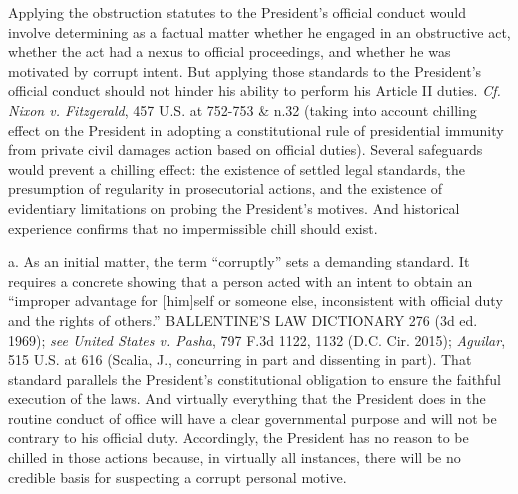 Applying the obstruction statutes to the President’s official conduct would involve determining as a factual matter whether he engaged in an obstructive act, whether the act had a nexus to official proceedings, and whether he was motivated by corrupt intent.
But applying those standards to the President’s official conduct should not hinder his ability to perform his Article II duties.
\textit{Cf. Nixon v. Fitzgerald}, 457 U.S. at 752-753 \& n.32 (taking into account chilling effect on the President in adopting a constitutional rule of presidential immunity from private civil damages action based on official duties).
Several safeguards would prevent a chilling effect: the existence of settled legal standards, the presumption of regularity in prosecutorial actions, and the existence of evidentiary limitations on probing the President’s motives.
And historical experience confirms that no impermissible chill should exist.

a. As an initial matter, the term “corruptly” sets a demanding standard.
It requires a concrete showing that a person acted with an intent to obtain an “improper advantage for [him]self or someone else, inconsistent with official duty and the rights of others.” BALLENTINE’S LAW DICTIONARY 276 (3d ed. 1969);
\textit{see United States v. Pasha}, 797 F.3d 1122, 1132 (D.C. Cir. 2015);
\textit{Aguilar}, 515 U.S. at 616 (Scalia, J., concurring in part and dissenting in part).
That standard parallels the President’s constitutional obligation to ensure the faithful execution of the laws.
And virtually everything that the President does in the routine conduct of office will have a clear governmental purpose and will not be contrary to his official duty.
Accordingly, the President has no reason to be chilled in those actions because, in virtually all instances, there will be no credible basis for suspecting a corrupt personal motive.

